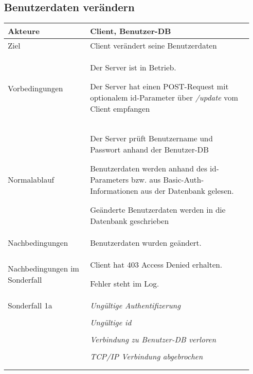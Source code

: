 \documentclass[a4paper,10pt,titlepage,parskip=true]{article}
\makeatletter
\newcommand\novspace{\@minipagetrue}
\newenvironment{owncompactitem}{%
\compactitem
}{%
\@finalstrut\@arstrutbox
\@nameuse{endcompactitem}%
\aftergroup\let\aftergroup\@finalstrut\aftergroup\@gobble
}
\newenvironment{owncompactenum}{%
\compactenum
}{%
\@finalstrut\@arstrutbox
\@nameuse{endcompactenum}%
\aftergroup\let\aftergroup\@finalstrut\aftergroup\@gobble
}
\newcommand{\usecase}[7]
{\subsection{#1}
\setlength{\extrarowheight}{2pt}
\begin{tabular}{|p{0.2\textwidth}|p{0.9\textwidth}|}
\hline
  Akteure & #2\\\hline
  Ziel & #3\\\hline
  Vorbedingungen & \novspace
  	\begin{owncompactitem}[-] #4 \end{owncompactitem} \\\hline
  Normalablauf & \vspace{-7pt}
  	\begin{owncompactenum}[1.] #6 \end{owncompactenum} \\\hline
  Nachbedingungen & \novspace
  	\begin{owncompactitem}[-] #5 \end{owncompactitem} \\\hline
  #7
\end{tabular}
}
\newcommand{\sonderfall}[4][\empty]
{
Sonderfall #2 & \vspace{-10pt}
	\textit{#3}
	\begin{owncompactenum}[{#2}.1] {#4} \end{owncompactenum}
  	\ifthenelse{\equal{#1}{\empty}}
    	{\\\hline} %
    	{\ensuremath{\rightarrow} #1 \\ [+1pt] \hline} %

}
\newcommand{\sondernachbedingung}[1]
{
Nachbedingungen im Sonderfall& \novspace
	\begin{owncompactitem}[-]
		#1
	\end{owncompactitem} \\\hline
}
\makeatother
\begin{document}
\usecase{Benutzerdaten verändern}{Client, Benutzer-DB}%
{Client verändert seine Benutzerdaten}%
{%
  \item Der Server ist in Betrieb.
  \item Der Server hat einen POST-Request mit optionalem id-Parameter über \textit{/update} vom Client empfangen
}
{%
  \item Benutzerdaten wurden geändert.
}
{%
  \item Der Server prüft Benutzername und Passwort anhand der Benutzer-DB
  \item Benutzerdaten werden anhand des id-Parameters bzw. aus Basic-Auth-Informationen aus der Datenbank gelesen.
  \item Geänderte Benutzerdaten werden in die Datenbank geschrieben
}
{%
  \sondernachbedingung{
	\item Client hat 403 Access Denied erhalten.
	\item Fehler steht im Log.
	}
	
	\sonderfall[Weiter mit normalem Betrieb]{1a}
    {Ungültige Authentifizerung}
    {
    \item Fehler wird ins Log geschrieben
  	\item Der Client erhält eine entsprechende Fehlermeldung mit HTTP-Status 403 Access Denied
    }
    
   	\sonderfall[Weiter mit normalem Betrieb]{2a}
    {Ungültige id}
    {
    \item Fehler wird ins Log geschrieben
  	\item Der Client erhält eine entsprechende Fehlermeldung
    }

	 \sonderfall[Kritischer Fehler, Server ist beendet]{*}%
	{Verbindung zu Benutzer-DB verloren}%
  	{
	\item Der Fehler wird ins Log geschrieben (als schwerwiegender Fehler)
	\item Der Client erhält eine entsprechende Fehlermeldung
	\item Der Server wird beendet
  	}

\sonderfall[Weiter mit normalem Betrieb]{**}%
	{TCP/IP Verbindung abgebrochen}%
	{
	\item Fehlermeldung wird ins Log geschrieben
	}
}
\end{document}
